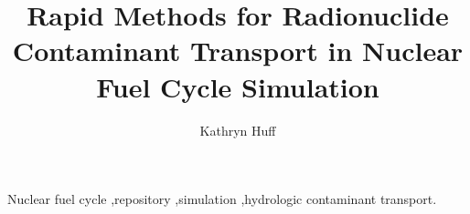 \documentclass[preprint]{elsarticle}
\begin{document}
\begin{frontmatter}



\title{Rapid Methods for Radionuclide Contaminant Transport in Nuclear Fuel Cycle Simulation}


\author[uiuc]{Kathryn Huff}
  \address[uiuc]{Department of Nuclear, Plasma, and Radiological Engineering, 
        118 Talbot Laboratory, MC 234, University of Illinois at 
        Urbana-Champaign, Urbana, IL 61801}


   \begin{abstract}
     

   \end{abstract}

   \begin{keyword}

     Nuclear fuel cycle \sep repository \sep simulation \sep hydrologic contaminant
     transport.


   \end{keyword}

 \end{frontmatter}

  \linenumbers
\end{document}
